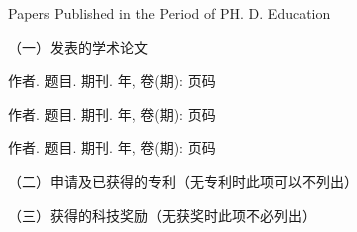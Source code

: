 
{} {Papers
Published in the Period of PH. D. Education}

（一）发表的学术论文
\begin{publist}
\item 作者. 题目. 期刊. 年, 卷(期): 页码

\item 作者. 题目. 期刊. 年, 卷(期): 页码

\item 作者. 题目. 期刊. 年, 卷(期): 页码
\end{publist}

（二）申请及已获得的专利（无专利时此项可以不列出）


（三）获得的科技奖励（无获奖时此项不必列出）







